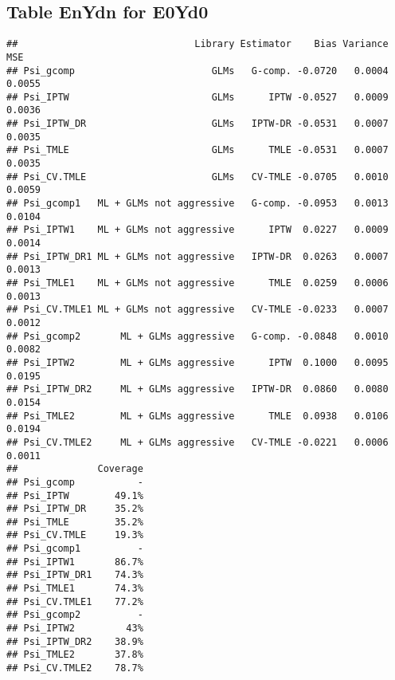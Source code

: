 \documentclass[11pt]{article}\usepackage[]{graphicx}\usepackage[]{color}
\makeatletter
\newenvironment{kframe}{%
 \def\at@end@of@kframe{}%
 \ifinner\ifhmode%
  \def\at@end@of@kframe{\end{minipage}}%
  \begin{minipage}{\columnwidth}%
 \fi\fi%
 \def\FrameCommand##1{\hskip\@totalleftmargin \hskip-\fboxsep
 \colorbox{shadecolor}{##1}\hskip-\fboxsep
     \hskip-\linewidth \hskip-\@totalleftmargin \hskip\columnwidth}%
 \MakeFramed {\advance\hsize-\width
   \@totalleftmargin\z@ \linewidth\hsize
   \@setminipage}}%
 {\par\unskip\endMakeFramed%
 \at@end@of@kframe}
\newenvironment{knitrout}{}{} %
\makeatother
\begin{document}
\subsection{Table EnYdn for E0Yd0}
\begin{knitrout}
\color{fgcolor}\begin{kframe}
\begin{verbatim}
##                               Library Estimator    Bias Variance    MSE
## Psi_gcomp                        GLMs   G-comp. -0.0720   0.0004 0.0055
## Psi_IPTW                         GLMs      IPTW -0.0527   0.0009 0.0036
## Psi_IPTW_DR                      GLMs   IPTW-DR -0.0531   0.0007 0.0035
## Psi_TMLE                         GLMs      TMLE -0.0531   0.0007 0.0035
## Psi_CV.TMLE                      GLMs   CV-TMLE -0.0705   0.0010 0.0059
## Psi_gcomp1   ML + GLMs not aggressive   G-comp. -0.0953   0.0013 0.0104
## Psi_IPTW1    ML + GLMs not aggressive      IPTW  0.0227   0.0009 0.0014
## Psi_IPTW_DR1 ML + GLMs not aggressive   IPTW-DR  0.0263   0.0007 0.0013
## Psi_TMLE1    ML + GLMs not aggressive      TMLE  0.0259   0.0006 0.0013
## Psi_CV.TMLE1 ML + GLMs not aggressive   CV-TMLE -0.0233   0.0007 0.0012
## Psi_gcomp2       ML + GLMs aggressive   G-comp. -0.0848   0.0010 0.0082
## Psi_IPTW2        ML + GLMs aggressive      IPTW  0.1000   0.0095 0.0195
## Psi_IPTW_DR2     ML + GLMs aggressive   IPTW-DR  0.0860   0.0080 0.0154
## Psi_TMLE2        ML + GLMs aggressive      TMLE  0.0938   0.0106 0.0194
## Psi_CV.TMLE2     ML + GLMs aggressive   CV-TMLE -0.0221   0.0006 0.0011
##              Coverage
## Psi_gcomp           -
## Psi_IPTW        49.1%
## Psi_IPTW_DR     35.2%
## Psi_TMLE        35.2%
## Psi_CV.TMLE     19.3%
## Psi_gcomp1          -
## Psi_IPTW1       86.7%
## Psi_IPTW_DR1    74.3%
## Psi_TMLE1       74.3%
## Psi_CV.TMLE1    77.2%
## Psi_gcomp2          -
## Psi_IPTW2         43%
## Psi_IPTW_DR2    38.9%
## Psi_TMLE2       37.8%
## Psi_CV.TMLE2    78.7%
\end{verbatim}
\end{kframe}
\end{knitrout}
\end{document}
